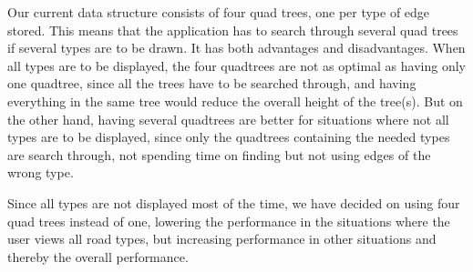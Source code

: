 Our current data structure consists of four quad trees, one per type of edge stored. This means that the application has to search through several quad trees if several types are to be drawn. It has both advantages and disadvantages. When all types are to be displayed, the four quadtrees are not as optimal as having only one quadtree, since all the trees have to be searched through, and having everything in the same tree would reduce the overall height of the tree(s). But on the other hand, having several quadtrees are better for situations where not all types are to be displayed, since only the quadtrees containing the needed types are search through, not spending time on finding but not using edges of the wrong type.

Since all types are not displayed most of the time, we have decided on using four quad trees instead of one, lowering the performance in the situations where the user views all road types, but increasing performance in other situations and thereby the overall performance.